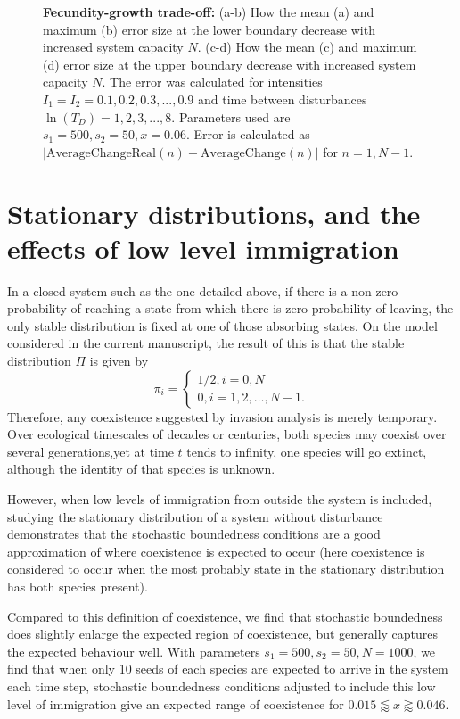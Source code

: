 \documentclass[a4paper]{article}
\begin{document}
\begin{figure}[th]
   \caption[Errors in approximating average change: fecundity-growth trade-off]{\textbf{Fecundity-growth trade-off:} (a-b)  How the mean (a) and maximum (b) error size at the lower boundary decrease with increased system capacity $N$. (c-d) How the mean (c) and maximum (d) error size at the upper boundary decrease with increased system capacity $N$. The error was calculated for intensities $I_1=I_2=0.1,0.2,0.3,...,0.9$ and time between disturbances $\ln(T_D)=1,2,3,...,8.$ Parameters used are $s_1=500,s_2=50,x=0.06$. Error is calculated as $| \text{AverageChangeReal}(n) - \text{AverageChange}(n) |$ for $n=1,N-1$.}
     \label{fig:fecunditygrowtherrors}
   \end{figure}
   
   \section{Stationary distributions, and the effects of low level immigration}
\label{app:stationary}
In a closed system such as the one detailed above, if there is a non zero probability of reaching a state from which there is zero probability of leaving, the only stable distribution is fixed at one of those absorbing states. On the model considered in the current manuscript, the result of this is that the stable distribution $\Pi$ is given by
\begin{equation}
\pi_i = \begin{cases}
1/2 , i = 0,N \\
0, i = 1,2,\dots,N-1. \end{cases}
\end{equation}
Therefore, any coexistence suggested by invasion analysis is merely temporary. Over ecological timescales of decades or centuries, both species may coexist over several generations,yet at time $t$ tends to infinity, one species will go extinct, although the identity of that species is unknown.

However, when low levels of immigration from outside the system is included, studying the stationary distribution of a system without disturbance demonstrates that the stochastic boundedness conditions are a good approximation of where coexistence is expected to occur (here coexistence is considered to occur when the most probably state in the stationary distribution has both species present).

Compared to this definition of coexistence, we find that stochastic boundedness does slightly enlarge the expected region of coexistence, but generally captures the expected behaviour well. With parameters $s_1=500,s_2=50,N=1000$, we find that when only 10 seeds of each species are expected to arrive in the system each time step, stochastic boundedness conditions adjusted to include this low level of immigration give an expected range of coexistence for $0.015 \lessapprox x \gtrapprox 0.046$.
\end{document}
